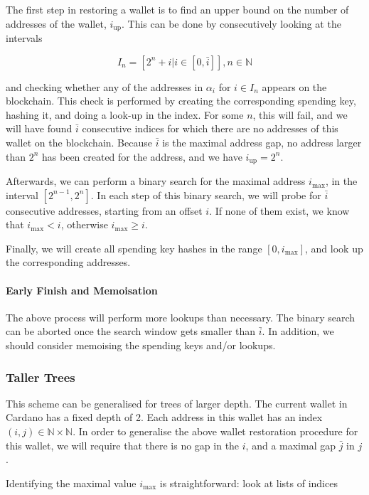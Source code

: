 \documentclass[11pt,a4paper]{article}
\begin{document}
The first step in restoring a wallet is to find an upper bound on the
number of addresses of the wallet, \(i_{\text{up}}\). This can be done
by consecutively looking at the intervals

\[
I_{n} = [2^n + i | i \in [0, \bar{i}]], n \in \mathbb{N}
\]

and checking whether any of the addresses in \(\alpha_i\) for
\(i \in I_{n}\) appears on the blockchain. This check is performed by
creating the corresponding spending key, hashing it, and doing a look-up
in the index. For some \(n\), this will fail, and we will have found
\(\bar{i}\) consecutive indices for which there are no addresses of this
wallet on the blockchain. Because \(\bar{i}\) is the maximal address
gap, no address larger than \(2^n\) has been created for the address,
and we have \(i_\text{up} = 2^n\).

Afterwards, we can perform a binary search for the maximal address
\(i_\text{max}\), in the interval \([2^{n-1}, 2^n]\). In each step of
this binary search, we will probe for \(\bar{i}\) consecutive addresses,
starting from an offset \(i\). If none of them exist, we know that
\(i_\text{max} < i\), otherwise \(i_\text{max} \geq i\).

Finally, we will create all spending key hashes in the range
\([0, i_\text{max}]\), and look up the corresponding addresses.

\paragraph{Early Finish and Memoisation}

The above process will perform more lookups than necessary. The binary
search can be aborted once the search window gets smaller than
\(\bar{i}\). In addition, we should consider memoising the spending keys
and/or lookups.

\subsubsection{Taller Trees}
\label{taller-trees}

This scheme can be generalised for trees of larger depth. The current
wallet in Cardano has a fixed depth of 2. Each address in this wallet
has an index \((i, j) \in \mathbb{N} \times \mathbb{N}\). In order to
generalise the above wallet restoration procedure for this wallet, we
will require that there is no gap in the \(i\), and a maximal gap
\(\bar{j}\) in \(j\).

Identifying the maximal value \(i_\text{max}\) is straightforward: look
at lists of indices
\end{document}
